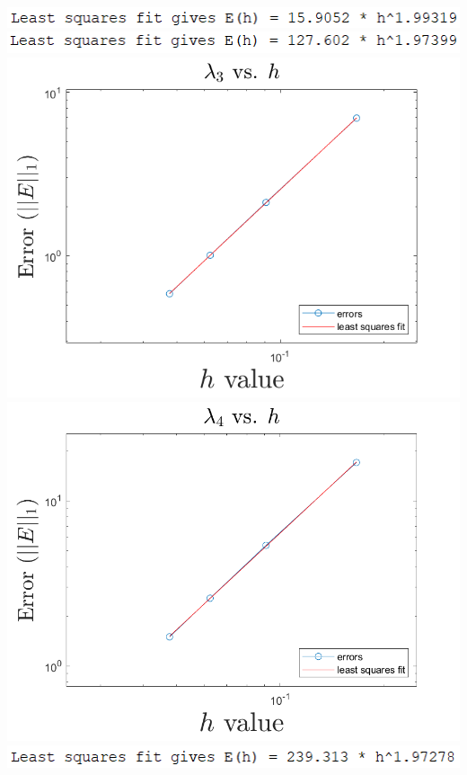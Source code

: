 \documentclass{article}
\begin{document}
\begin{enumerate}
\begin{center}
        \newline
        \includegraphics[scale = 0.6]{lam1err.PNG} \:\:\:\:
        \includegraphics[scale = 0.6]{lam2err.PNG}
        \newline
        \includegraphics[scale = 0.4]{laplaceLam3.png}
        \includegraphics[scale = 0.5]{laplaceLam4.png}
        \newline
        \includegraphics[scale = 0.6]{lam3err.PNG} \:\:\:\:

\end{center}
\end{enumerate}
\end{document}
